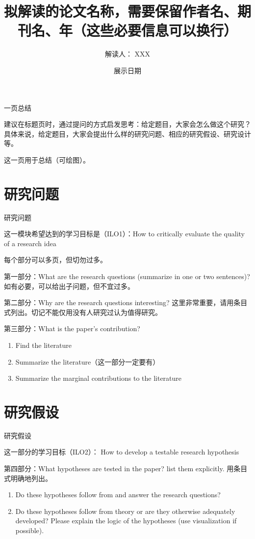 \documentclass[10pt,aspectratio=169,compress,ignorenonframetext]{beamer}
\title[论文名称]{\Huge 拟解读的论文名称，需要保留作者名、期刊名、年（这些必要信息可以换行）}
\author{解读人： XXX}
\institute{武汉大学金融系}
\date{展示日期}
\begin{document}
\begin{frame}
\titlepage
\end{frame}


\begin{frame}{一页总结}

建议在标题页时，通过提问的方式启发思考：给定题目，大家会怎么做这个研究？具体来说，给定题目，大家会提出什么样的研究问题、相应的研究假设、研究设计等。

这一页用于总结（可绘图）。
\end{frame}



\section{研究问题}

\begin{frame}{研究问题}

这一模块希望达到的学习目标是（ILO1）：How to critically evaluate the quality of a research idea


每个部分可以多页，但切勿过多。

第一部分：What are the research questions (summarize in one or two sentences)? 如有必要，可以给出子问题，但不宜过多。

第二部分：Why are the research questions interesting? 这里非常重要，请用条目式列出。切记不能仅用没有人研究过认为值得研究。

第三部分：What is the paper's contribution? 
\begin{enumerate}
	\item Find the literature
	\item Summarize the literature（这一部分一定要有）
	\item Summarize the marginal contributions to the literature
\end{enumerate}

\end{frame}

\section{研究假设}

\begin{frame}{研究假设}

这一部分的学习目标（ILO2）： How to develop a testable research hypothesis

第四部分：What hypotheses are tested in the paper? list them explicitly. 用条目式明确地列出。

\begin{enumerate}
	\item Do these hypotheses follow from and answer the research questions?
	\item Do these hypotheses follow from theory or are they otherwise adequately developed? Please explain the logic of the hypotheses (use visualization if possible).
\end{enumerate}

\end{frame}
\end{document}
